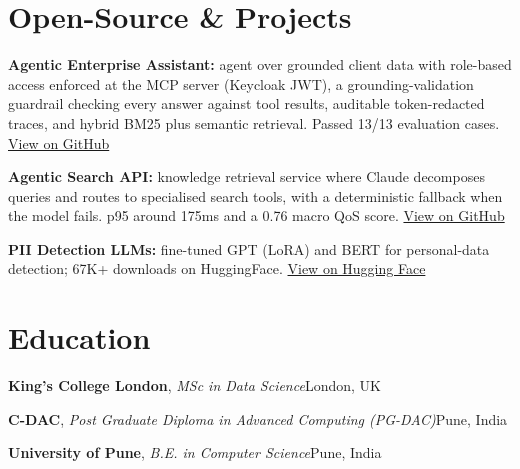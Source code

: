 \documentclass[10pt,a4paper]{article}
\begin{document}
\section{Open-Source \& Projects}
\begin{tight}
  \item \textbf{Agentic Enterprise Assistant:} agent over grounded client data with role-based access enforced at the MCP server (Keycloak JWT), a grounding-validation guardrail checking every answer against tool results, auditable token-redacted traces, and hybrid BM25 plus semantic retrieval. Passed 13/13 evaluation cases. \href{https://github.com/abhijeetscode/Agentic-Enterprise-Assistant}{View on GitHub}
  \item \textbf{Agentic Search API:} knowledge retrieval service where Claude decomposes queries and routes to specialised search tools, with a deterministic fallback when the model fails. p95 around 175ms and a 0.76 macro QoS score. \href{https://github.com/abhijeetscode/search-agent}{View on GitHub}
  \item \textbf{PII Detection LLMs:} fine-tuned GPT (LoRA) and BERT for personal-data detection; 67K+ downloads on HuggingFace. \href{https://huggingface.co/ab-ai/pii_model}{View on Hugging Face}
\end{tight}

\section{Education}
{\color{company}\bfseries King's College London}, {\itshape MSc in Data Science}\hfill {\color{muted}London, UK}\par\vspace{2pt}
{\color{company}\bfseries C-DAC}, {\itshape Post Graduate Diploma in Advanced Computing (PG-DAC)}\hfill {\color{muted}Pune, India}\par\vspace{2pt}
{\color{company}\bfseries University of Pune}, {\itshape B.E. in Computer Science}\hfill {\color{muted}Pune, India}\par
\end{document}
